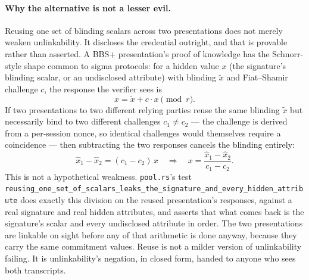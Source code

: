 \documentclass[11pt]{article}
\newcommand{\ub}{\_\allowbreak}
\begin{document}
\paragraph{Why the alternative is not a lesser evil.} Reusing one set of
blinding scalars across two presentations does not merely weaken
unlinkability. It discloses the credential outright, and that is provable
rather than asserted. A BBS+ presentation's proof of knowledge has the
Schnorr-style shape common to sigma protocols: for a hidden value $x$ (the
signature's blinding scalar, or an undisclosed attribute) with blinding
$\tilde{x}$ and Fiat--Shamir challenge $c$, the response the verifier sees
is
\begin{equation}
\hat{x} = \tilde{x} + c \cdot x \pmod{r}.
\end{equation}
If two presentations to two different relying parties reuse the same
blinding $\tilde{x}$ but necessarily bind to two different challenges $c_1
\neq c_2$ --- the challenge is derived from a per-session nonce, so
identical challenges would themselves require a coincidence --- then
subtracting the two responses cancels the blinding entirely:
\begin{equation}
\hat{x}_1 - \hat{x}_2 = (c_1 - c_2)\, x
\quad\Longrightarrow\quad
x = \frac{\hat{x}_1 - \hat{x}_2}{c_1 - c_2}.
\end{equation}
This is not a hypothetical weakness. \texttt{pool.rs}'s test
\texttt{reusing\ub one\ub set\ub of\ub scalars\ub leaks\ub the\ub signature\ub and\ub every\ub hidden\ub attribute}
does exactly this division on the reused presentation's responses, against a
real signature and real hidden attributes, and asserts that what comes back
is the signature's scalar and every undisclosed attribute in order. The two
presentations are linkable on sight before any of that arithmetic is done
anyway, because they carry the same commitment values. Reuse is not a milder
version of unlinkability failing. It is unlinkability's negation, in closed
form, handed to anyone who sees both transcripts.
\end{document}
